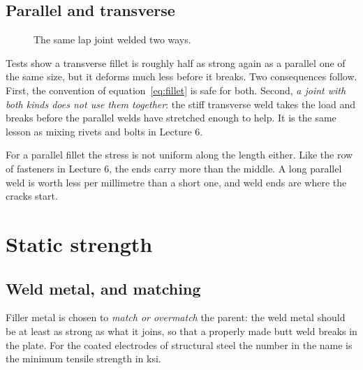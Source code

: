 \documentclass[11pt,a4paper]{article}
\begin{document}
\subsection{Parallel and transverse}

\begin{figure}[H]\centering
\resizebox{0.95\textwidth}{!}{}
\caption{The same lap joint welded two ways.}
\label{fig:loading}
\end{figure}

Tests show a transverse fillet is roughly half as strong again as a parallel one of the same size,
but it deforms much less before it breaks. Two consequences follow. First, the convention of
equation~\eqref{eq:fillet} is safe for both. Second, \emph{a joint with both kinds does not use
them together}: the stiff transverse weld takes the load and breaks before the parallel welds have
stretched enough to help. It is the same lesson as mixing rivets and bolts in Lecture 6.

\medskip
For a parallel fillet the stress is not uniform along the length either. Like the row of fasteners
in Lecture 6, the ends carry more than the middle. A long parallel weld is worth less per
millimetre than a short one, and weld ends are where the cracks start.

\section{Static strength}
\label{sec:static}

\subsection{Weld metal, and matching}

Filler metal is chosen to \emph{match or overmatch} the parent: the weld metal should be at least
as strong as what it joins, so that a properly made butt weld breaks in the plate. For the coated
electrodes of structural steel the number in the name is the minimum tensile strength in ksi.
\end{document}

